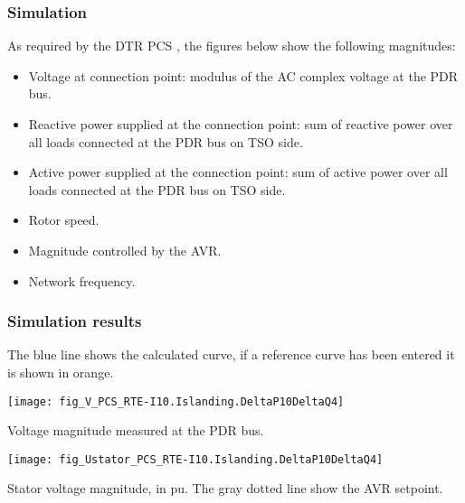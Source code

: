     \subsubsection{Simulation}
    As required by the DTR PCS \DTRPcs, the figures below show the
    following magnitudes:
    \begin{itemize}
        \item Voltage at connection point: modulus of the AC complex voltage at
        the PDR bus.
        \item Reactive power supplied at the connection point: sum of reactive power over
        all loads connected at the PDR bus on TSO side.
        \item Active power supplied at the connection point: sum of active power over
        all loads connected at the PDR bus on TSO side.
        \item Rotor speed.
        \item Magnitude controlled by the AVR.
        \item Network frequency.
    \end{itemize}

    \subsubsection{Simulation results}
    The blue line shows the calculated curve, if a reference curve has been entered it is
    shown in orange.

    \noindent
    \begin{minipage}[t]{0.48\textwidth}
        \centering
        \texttt{[image: fig\_V\_PCS\_RTE-I10.Islanding.DeltaP10DeltaQ4]}
        \begin{minipage}[t]{0.8\textwidth}
            \small Voltage magnitude measured at the PDR bus.
        \end{minipage}
    \end{minipage}
    \hfill
    \begin{minipage}[t]{0.48\textwidth}
        \centering
        \texttt{[image: fig\_Ustator\_PCS\_RTE-I10.Islanding.DeltaP10DeltaQ4]}
        \begin{minipage}[t]{0.8\textwidth}
            \small Stator voltage magnitude, in pu. The gray dotted line show
            the AVR setpoint.
        \end{minipage}
    \end{minipage}

